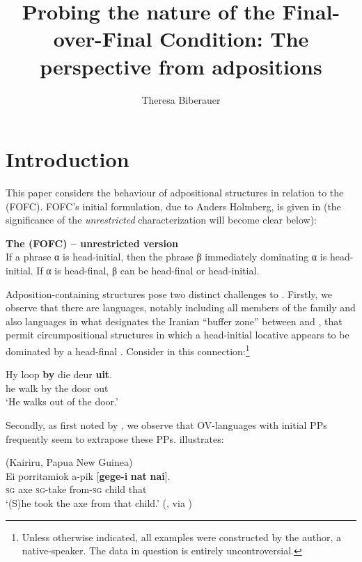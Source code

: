 \documentclass[output=paper]{LSP/langsci}
\author{Theresa Biberauer\affiliation{University of Cambridge and Stellenbosch University} 
}
\title{Probing the nature of the Final-over-Final Condition: The perspective from adpositions}
\begin{document}
 

 

\section{Introduction}

This paper considers the behaviour of adpositional structures in relation to the  (FOFC). FOFC’s initial formulation, due to Anders Holmberg, is given in  (the significance of the \textit{unrestricted} characterization will become clear below):

\ea%
  \label{ex:biberauer:1}
	  \textbf{The  (FOFC) – unrestricted version}\\
If a phrase α is head-initial, then the phrase β immediately dominating α is head-initial. If α is head-final, β can be head-final or head-initial.  \citep[124]{Holmberg2000deriving} 
	  \z

\noindent Adposition-containing structures pose two distinct challenges to . Firstly, we observe that there are languages, notably including all members of the  family and also languages in what \citet{Stilo2005} designates the Iranian “buffer zone” between  and , that permit circumpositional structures in which a head-initial locative  appears to be dominated by a head-final  . Consider   in this connection:\footnote{Unless otherwise indicated, all  examples were constructed by the author, a native-speaker. The data in {question} is entirely uncontroversial.}

\ea%
    \label{ex:biberauer:2}
    
    \gll  Hy loop \textbf{by} die deur \textbf{uit}.\\
	  he walk by the door out\\
    \glt  ‘He walks out of the door.’
    \z 

Secondly, as first noted by \citet{Sheehan2008}, we observe that OV-languages with initial PPs frequently seem to extrapose these PPs.  illustrates:

\ea%
    \label{ex:biberauer:3}
    (Kairiru, Papua New Guinea)\\
    \gll  Ei    porritamiok  a-pik   [\textbf{gege-i}      \textbf{nat}    \textbf{nai}].  \\
	  \textsc{sg} axe               \textsc{sg}{}-take {\db}from-\textsc{sg} child that\\ 
    \glt  ‘(S)he took the axe from that child.’ (\citealt[151]{Wivell1981}, via \citealt[170]{Hawkins2008})
    \z
\end{document}

